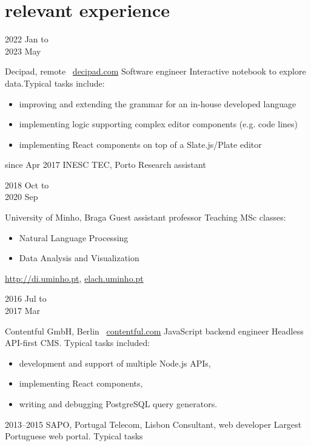 \documentclass[a4paper]{friggeri-cv}
\begin{document}
\section{relevant experience}
\begin{entrylist}
  \entry
    {\parbox[t][][t]{1.8cm}{2022 {\footnotesize Jan to}\\2023
    {\footnotesize May}}}
    {Decipad, remote \textendash~\url{decipad.com}}
    {Software engineer}
    {Interactive  notebook to explore data.\footnotesize{Typical tasks
    include:}}
    {\begin{itemize}
      \item improving and extending the grammar for an in-house developed language
      \item implementing logic supporting complex editor components (e.g. code lines)
      \item implementing React components on top of a Slate.js/Plate editor
    \end{itemize}}
  \entry
    {{\tiny since} Apr 2017}
    {INESC TEC, Porto}
    {Research assistant}
    {\vspace{-0.7cm}}
    {}
  \entry
    {\parbox[t][][t]{1.8cm}{2018 {\footnotesize Oct to}\\2020
    {\footnotesize Sep}}}
    {University of Minho, Braga}
    {Guest assistant professor}
    {Teaching MSc classes:}
    {\begin{itemize}
        \item Natural Language Processing
        \item Data Analysis and Visualization
    \end{itemize}
    \url{http://di.uminho.pt}, \url{elach.uminho.pt}
    }
  \entry
    {\parbox[t][][t]{1.8cm}{2016 {\footnotesize Jul to}\\2017 {\footnotesize Mar}}}
    {Contentful GmbH, Berlin \textendash~\url{contentful.com}}
    {JavaScript backend engineer}
    {Headless API-first CMS. \footnotesize{Typical tasks
    included:}}
    {\begin{itemize}
        \item development and support of multiple Node.js APIs,
        \item implementing React components,
        \item writing and debugging PostgreSQL query generators.
    \end{itemize}
    }
  \entry
    {2013--2015}
    {SAPO, Portugal Telecom, Lisbon}
    {Consultant, web developer}
    {Largest Portuguese web portal. \footnotesize{Typical tasks
}}
\end{entrylist}
\end{document}

